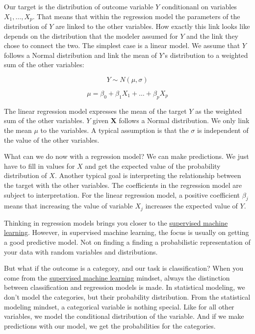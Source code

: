\documentclass[
  10pt,
]{scrbook}
\begin{document}
Our target is the distribution of outcome variable \(Y\) conditionanl on variables \(X_1, \ldots, X_p\).
That means that within the regression model the parameters of the distribution of \(Y\) are linked to the other variables.
How exactly this link looks like depends on the distribution that the modeler assumed for \(Y\) and the link they chose to connect the two.
The simplest case is a linear model.
We assume that \(Y\) follows a Normal distribution and link the mean of \(Y\)'s distribution to a weighted sum of the other variables:

\[Y \sim N(\mu, \sigma)\]

\[\mu = \beta_0 + \beta_1 X_1 + \ldots + \beta_p X_p\]

The linear regression model expresses the mean of the target \(Y\) as the weighted sum of the other variables.
\(Y\) given \(\mathbf{X}\) follows a Normal distribution.
We only link the mean \(\mu\) to the variables.
A typical assumption is that the \(\sigma\) is independent of the value of the other variables.

What can we do now with a regression model?
We can make predictions.
We just have to fill in values for \(X\) and get the expected value of the probability distribution of \(X\).
Another typical goal is interpreting the relationship between the target with the other variables.
The coefficients in the regression model are subject to interpretation.
For the linear regression model, a positive coefficient \(\beta_j\) means that increasing the value of variable \(X_j\) increases the expected value of \(Y\).

Thinking in regression models brings you closer to the \protect\hyperlink{mindset}{supervised machine learning}.
However, in supervised machine learning, the focus is usually on getting a good predictive model.
Not on finding a finding a probabilistic representation of your data with random variables and distributions.

But what if the outcome is a category, and our task is classification?
When you come from the \protect\hyperlink{supervised-ml}{supervised machine learning} mindset, always the distinction between classification and regression models is made.
In statistical modeling, we don't model the categories, but their probability distribution.
From the statistical modeling mindset, a categorical variable is nothing special.
Like for all other variables, we model the conditional distribution of the variable.
And if we make predictions with our model, we get the probabilities for the categories.
\end{document}
